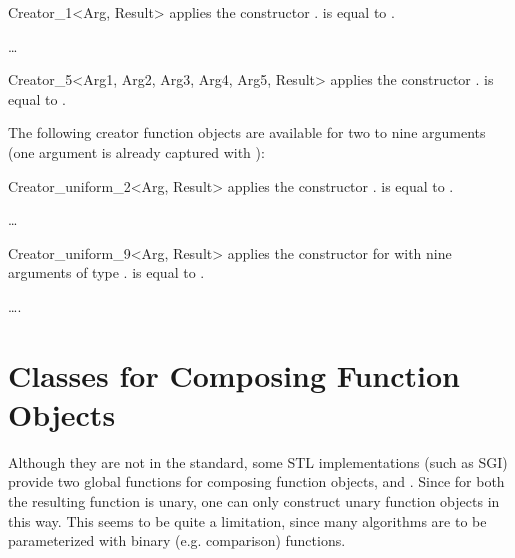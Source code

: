 
\ccHtmlNoClassFile
\begin{ccClassTemplate}{Creator_1<Arg, Result>}
    {applies the constructor .
       is equal to .}
\end{ccClassTemplate}

\ldots

\ccHtmlNoClassFile
\begin{ccClassTemplate}{Creator_5<Arg1, Arg2, Arg3, Arg4, Arg5, Result>}
    {applies the constructor .
       is equal to .}
\end{ccClassTemplate}

The following creator function objects are available for two to nine
arguments (one argument is already captured with ):

\ccHtmlNoClassFile
\begin{ccClassTemplate}{Creator_uniform_2<Arg, Result>}
    {applies the constructor .
       is equal to .}
\end{ccClassTemplate}

\ldots

\ccHtmlNoClassFile
\begin{ccClassTemplate}{Creator_uniform_9<Arg, Result>}
    {applies the constructor for  with nine arguments of
     type .   is equal to .}
\end{ccClassTemplate}

\ccSeeAlso

 \ldots.


\newpage
\section{Classes for Composing Function Objects}
\label{sectionComposeFunctionClasses}

Although they are not in the standard, some STL implementations (such
as SGI) provide two global functions for composing function objects,
 and . Since for both the
resulting function is unary, one can only construct unary function
objects in this way. This seems to be quite a limitation, since many
algorithms are to be parameterized with binary (e.g. comparison)
functions.

